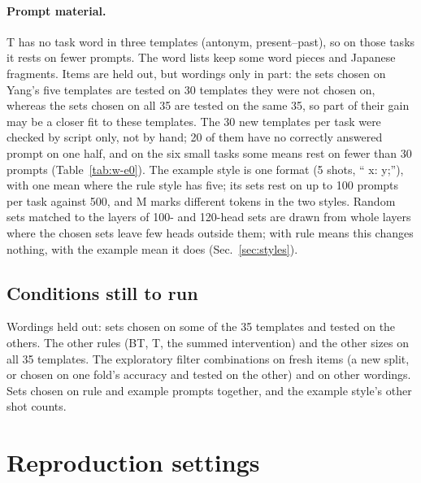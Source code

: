 \documentclass[10pt,a4paper]{article}
\begin{document}
\paragraph{Prompt material.} T has no task word in three templates (antonym, present--past), so on those tasks it rests on fewer prompts. The word lists keep some word pieces and Japanese fragments. Items are held out, but wordings only in part: the sets chosen on Yang's five templates are tested on 30 templates they were not chosen on, whereas the sets chosen on all 35 are tested on the same 35, so part of their gain may be a closer fit to these templates. The 30 new templates per task were checked by script only, not by hand; 20 of them have no correctly answered prompt on one half, and on the six small tasks some means rest on fewer than 30 prompts (Table~\ref{tab:w-e0}). The example style is one format (5 shots, `` x: y;''), with one mean where the rule style has five; its sets rest on up to 100 prompts per task against 500, and M marks different tokens in the two styles. Random sets matched to the layers of 100- and 120-head sets are drawn from whole layers where the chosen sets leave few heads outside them; with rule means this changes nothing, with the example mean it does (Sec.~\ref{sec:styles}).

\subsection*{Conditions still to run}
Wordings held out: sets chosen on some of the 35 templates and tested on the others. The other rules (BT, T, the summed intervention) and the other sizes on all 35 templates. The exploratory filter combinations on fresh items (a new split, or chosen on one fold's accuracy and tested on the other) and on other wordings. Sets chosen on rule and example prompts together, and the example style's other shot counts.




\clearpage
\appendix

\section{Reproduction settings}\label{app:fidelity}
\end{document}
